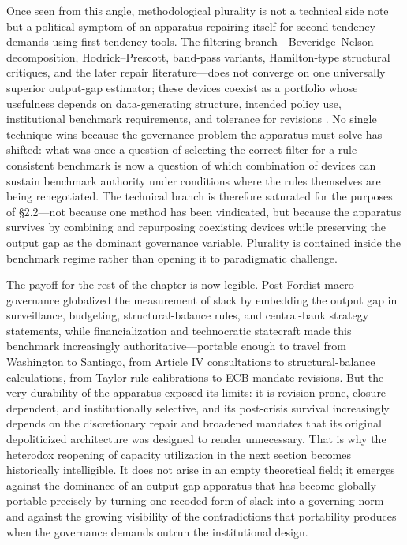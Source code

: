 \documentclass[11pt,a4paper]{article}
\begin{document}
Once seen from this angle, methodological plurality is not a technical side note
but a political symptom of an apparatus repairing itself for second-tendency
demands using first-tendency tools. The filtering branch---Beveridge--Nelson
decomposition, Hodrick--Prescott, band-pass variants, Hamilton-type structural
critiques, and the later repair literature---does not converge on one universally
superior output-gap estimator; these devices coexist as a portfolio whose
usefulness depends on data-generating structure, intended policy use,
institutional benchmark requirements, and tolerance for revisions
\citep{BeveridgeNelson1981,HodrickPrescott1997,BaxterKing1999,%
	ChristianoFitzgerald2003,Hamilton2018,FrankeKukackaSacht2024,Siemers2025}. No
single technique wins because the governance problem the apparatus must solve has
shifted: what was once a question of selecting the correct filter for a
rule-consistent benchmark is now a question of which combination of devices can
sustain benchmark authority under conditions where the rules themselves are being
renegotiated. The technical branch is therefore saturated for the purposes of
\S2.2---not because one method has been vindicated, but because the apparatus
survives by combining and repurposing coexisting devices while preserving the
output gap as the dominant governance variable. Plurality is contained inside the
benchmark regime rather than opening it to paradigmatic challenge.



The payoff for the rest of the chapter is now legible. Post-Fordist macro
governance globalized the measurement of slack by embedding the output gap in
surveillance, budgeting, structural-balance rules, and central-bank strategy
statements, while financialization and technocratic statecraft made this benchmark
increasingly authoritative---portable enough to travel from Washington to
Santiago, from Article IV consultations to structural-balance calculations, from
Taylor-rule calibrations to ECB mandate revisions. But the very durability of the
apparatus exposed its limits: it is revision-prone, closure-dependent, and
institutionally selective, and its post-crisis survival increasingly depends on
the discretionary repair and broadened mandates that its original depoliticized
architecture was designed to render unnecessary. That is why the heterodox
reopening of capacity utilization in the next section becomes historically
intelligible. It does not arise in an empty theoretical field; it emerges against
the dominance of an output-gap apparatus that has become globally portable
precisely by turning one recoded form of slack into a governing norm---and against
the growing visibility of the contradictions that portability produces when the
governance demands outrun the institutional design.
\end{document}
